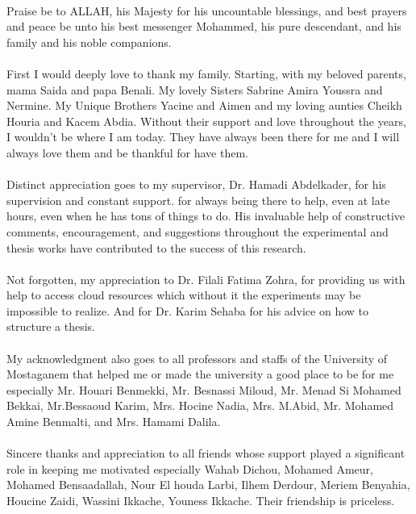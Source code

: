 \paragraph{}
Praise be to ALLAH, his Majesty for his uncountable blessings, and best prayers and peace be unto his best messenger Mohammed, his pure descendant, and his family and his noble companions.
\paragraph{}
First I would deeply love to thank my family. Starting, with my beloved parents, mama Saida and papa Benali. My lovely Sisters Sabrine Amira Youssra and Nermine. My Unique Brothers Yacine and  Aimen and my loving aunties Cheikh Houria and Kacem Abdia. Without their support and love throughout the years, I wouldn't be where I am today. They have always been there for me and I will always love them and be thankful for have them. 
\paragraph{}
Distinct appreciation goes to my supervisor, Dr. Hamadi Abdelkader, for his supervision and constant support. for always being there to help, even at late hours, even when he has tons of things to do. His invaluable help of constructive comments, encouragement, and suggestions throughout the experimental and thesis works have contributed to the success of this research.
\paragraph{}
Not forgotten, my appreciation to Dr. Filali Fatima Zohra, for providing us with help to access cloud resources which without it the experiments may be impossible to realize. And for Dr. Karim Sehaba for his advice on how to structure a thesis. 
\paragraph{}
My acknowledgment also goes to all professors and staffs of the University of Mostaganem that helped me or made the university a good place to be for me especially Mr. Houari Benmekki, Mr. Besnassi Miloud, Mr. Menad Si Mohamed Bekkai, Mr.Bessaoud Karim, Mrs. Hocine Nadia, Mrs. M.Abid, Mr. Mohamed Amine Benmalti, and Mrs. Hamami Dalila.
\paragraph{}
Sincere thanks and appreciation to all friends whose support played a significant role in keeping me motivated especially Wahab Dichou, Mohamed Ameur, Mohamed Bensaadallah, Nour El houda Larbi, Ilhem Derdour, Meriem Benyahia, Houcine Zaidi, Wassini Ikkache, Youness Ikkache. Their friendship is priceless.
